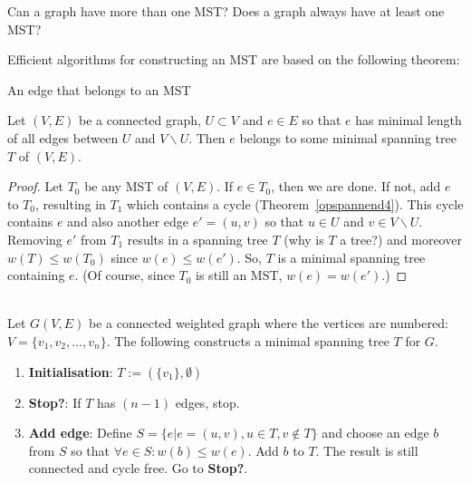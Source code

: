 Can a graph have more than one MST? Does a graph always have at least
one MST?

Efficient algorithms for constructing an MST are based on the following
theorem:

\begin{theorem} An edge that belongs to an MST \label{even}

Let $(V,E)$ be a connected graph, $U \subset V$ and $e \in E$
so that $e$ has minimal length of all edges between $U$ and $V
\backslash U$. Then $e$ belongs to some minimal spanning tree $T$ of
$(V,E)$.
\end{theorem} %
\begin{proof} Let $T_{0}$ be any MST of $(V,E)$. If $e \in T_{0}$,
then we are done. If not, add $e$ to $T_{0}$, resulting in $T_{1}$
which contains a cycle (Theorem~\ref{opspannend4}). This cycle
contains $e$ and also another edge $e' = (u,v)$ so that $u \in U$ and
$v \in V \backslash U$. Removing $e'$ from $T_{1}$ results in a
spanning tree $T$ (why is $T$ a tree?) and moreover $w(T) \leq
w(T_{0})$ since $w(e) \leq w(e')$. So, $T$ is a minimal spanning tree
containing $e$. (Of course, since $T_0$ is still an MST, $w(e) = w(e')$.)
\end{proof}


\begin{code}[Prim]\label{prim}~\\
  Let $G(V,E)$ be a connected weighted graph where the
vertices are numbered: $V = \{v_{1},v_{2},\ldots,v_{n}\}$. The
following constructs a minimal spanning tree $T$ for $G$.
\begin{enumerate}
\item \textbf{Initialisation}: $T := (\{v_{1}\},\emptyset)$
\item \textbf{Stop?}: If $T$ has $(n-1)$ edges, stop.
\item \textbf{Add edge}:
Define $S = \{e | e = (u,v), u \in T, v \notin T\}$ and choose an edge
$b$ from $S$ so that $\forall e \in S: w(b) \leq w(e)$. Add $b$ to
$T$. The result is still connected and cycle free.
Go to \textbf{Stop?}.
\end{enumerate}
\end{code}

